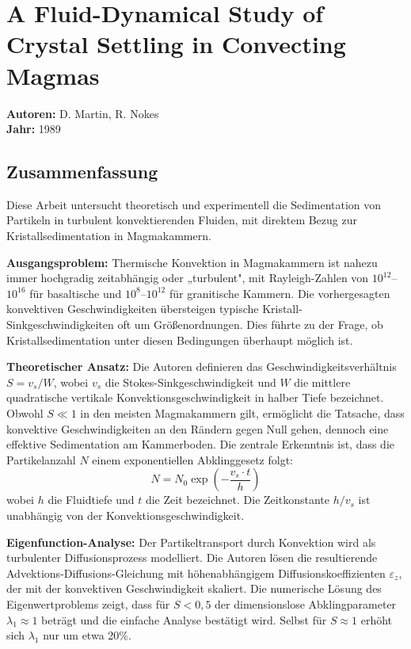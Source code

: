 \documentclass[a4paper,12pt]{article}
\begin{document}
\section*{A Fluid-Dynamical Study of Crystal Settling in Convecting Magmas}
\textbf{Autoren:} D. Martin, R. Nokes \\
\textbf{Jahr:} 1989
\subsection*{Zusammenfassung}

Diese Arbeit untersucht theoretisch und experimentell die Sedimentation von Partikeln in turbulent konvektierenden Fluiden, mit direktem Bezug zur Kristallsedimentation in Magmakammern.

\textbf{Ausgangsproblem:} Thermische Konvektion in Magmakammern ist nahezu immer hochgradig zeitabhängig oder „turbulent", mit Rayleigh-Zahlen von $10^{12}$--$10^{16}$ für basaltische und $10^8$--$10^{12}$ für granitische Kammern. Die vorhergesagten konvektiven Geschwindigkeiten übersteigen typische Kristall-Sinkgeschwindigkeiten oft um Größenordnungen. Dies führte zu der Frage, ob Kristallsedimentation unter diesen Bedingungen überhaupt möglich ist.

\textbf{Theoretischer Ansatz:} Die Autoren definieren das Geschwindigkeitsverhältnis $S = v_s/W$, wobei $v_s$ die Stokes-Sinkgeschwindigkeit und $W$ die mittlere quadratische vertikale Konvektionsgeschwindigkeit in halber Tiefe bezeichnet. Obwohl $S \ll 1$ in den meisten Magmakammern gilt, ermöglicht die Tatsache, dass konvektive Geschwindigkeiten an den Rändern gegen Null gehen, dennoch eine effektive Sedimentation am Kammerboden. Die zentrale Erkenntnis ist, dass die Partikelanzahl $N$ einem exponentiellen Abklinggesetz folgt:
\begin{equation}
N = N_0 \exp\left(-\frac{v_s \cdot t}{h}\right)
\end{equation}
wobei $h$ die Fluidtiefe und $t$ die Zeit bezeichnet. Die Zeitkonstante $h/v_s$ ist unabhängig von der Konvektionsgeschwindigkeit.

\textbf{Eigenfunction-Analyse:} Der Partikeltransport durch Konvektion wird als turbulenter Diffusionsprozess modelliert. Die Autoren lösen die resultierende Advektions-Diffusions-Gleichung mit höhenabhängigem Diffusionskoeffizienten $\varepsilon_z$, der mit der konvektiven Geschwindigkeit skaliert. Die numerische Lösung des Eigenwertproblems zeigt, dass für $S < 0{,}5$ der dimensionslose Abklingparameter $\lambda_1 \approx 1$ beträgt und die einfache Analyse bestätigt wird. Selbst für $S \approx 1$ erhöht sich $\lambda_1$ nur um etwa 20\%.
\end{document}
